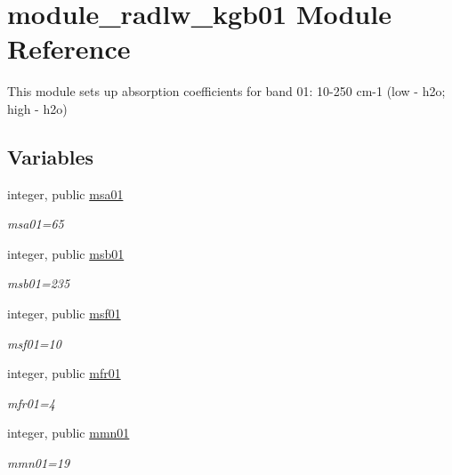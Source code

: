 \hypertarget{namespacemodule__radlw__kgb01}{}\section{module\+\_\+radlw\+\_\+kgb01 Module Reference}
\label{namespacemodule__radlw__kgb01}


This module sets up absorption coefficients for band 01\+: 10-\/250 cm-\/1 (low -\/ h2o; high -\/ h2o)  


\subsection*{Variables}
\begin{DoxyCompactItemize}
\item 
\mbox{\label{namespacemodule__radlw__kgb01_a60db2a67b7f03a52fa88acd2c7874dfc}} 
integer, public \hyperlink{namespacemodule__radlw__kgb01_a60db2a67b7f03a52fa88acd2c7874dfc}{msa01}
\begin{DoxyCompactList}\small\item\em msa01=65 \end{DoxyCompactList}\item 
integer, public \hyperlink{group__module__radlw__kgbnn_gae34d953adc793ad27a294864e3e0e354}{msb01}
\begin{DoxyCompactList}\small\item\em msb01=235 \end{DoxyCompactList}\item 
integer, public \hyperlink{group__module__radlw__kgbnn_ga321c2e84e14d28142d08bb5fbe485a67}{msf01}
\begin{DoxyCompactList}\small\item\em msf01=10 \end{DoxyCompactList}\item 
integer, public \hyperlink{group__module__radlw__kgbnn_ga4bd2e710d96291436f9ee36e99816a19}{mfr01}
\begin{DoxyCompactList}\small\item\em mfr01=4 \end{DoxyCompactList}\item 
integer, public \hyperlink{group__module__radlw__kgbnn_ga218c6844f9043f362571f091a4f80522}{mmn01}
\begin{DoxyCompactList}\small\item\em mmn01=19 \end{DoxyCompactList}\item 

\end{DoxyCompactItemize}
